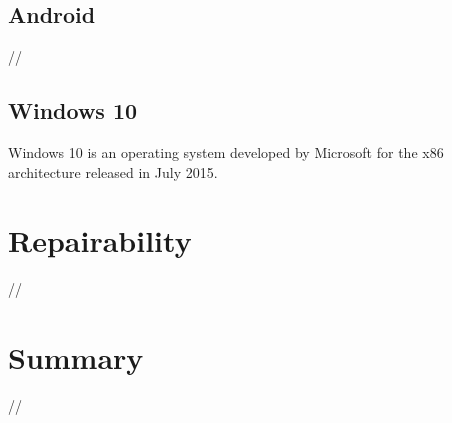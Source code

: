 \subsection{Android}

//


\subsection{Windows 10}

Windows 10 is an operating system developed by Microsoft for the x86 architecture released in July 2015.


\section{Repairability}

//


\section{Summary}

//